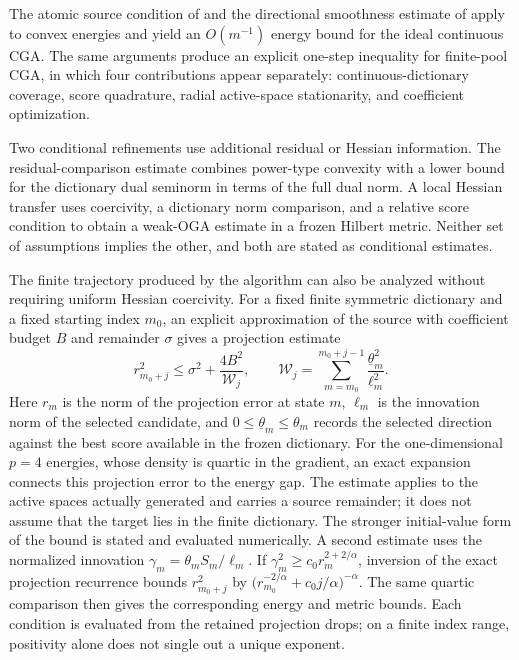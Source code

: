 The atomic source condition of  and the directional smoothness estimate of
 apply to convex energies and yield an \(O(m^{-1})\) energy bound for the ideal
continuous CGA. The same arguments produce an explicit one-step inequality for finite-pool CGA, in
which four contributions appear separately: continuous-dictionary coverage, score quadrature, radial
active-space stationarity, and coefficient optimization.

Two conditional refinements use additional residual or Hessian information. The residual-comparison
estimate combines power-type convexity with a lower bound for the dictionary dual seminorm in terms
of the full dual norm. A local Hessian transfer uses coercivity, a dictionary norm comparison, and a
relative score condition to obtain a weak-OGA estimate in a frozen Hilbert metric. Neither set of
assumptions implies the other, and both are stated as conditional estimates.

The finite trajectory produced by the algorithm can also be analyzed without requiring uniform
Hessian coercivity. For a fixed finite symmetric dictionary and a fixed starting index \(m_0\), an
explicit approximation of the source with coefficient budget \(B\) and remainder \(\sigma\) gives a
projection estimate
\[
 r_{m_0+j}^2\le \sigma^2+\frac{4B^2}{\mathcal W_j},
 \qquad
 \mathcal W_j=\sum_{m=m_0}^{m_0+j-1}\frac{\underline\theta_m^2}{\ell_m^2}.
\]
Here \(r_m\) is the norm of the projection error at state \(m\), \(\ell_m\) is the innovation norm of
the selected candidate, and \(0\leq\underline\theta_m\leq\theta_m\) records the selected direction
against the best score available in the frozen dictionary. For the one-dimensional \(p=4\) energies,
whose density is quartic in the gradient, an exact expansion connects this projection error to the
energy gap. The estimate applies to the active spaces actually generated and carries a source
remainder; it does not assume that the target lies in the finite dictionary. The stronger
initial-value form of the bound is stated and evaluated numerically. A second estimate uses the
normalized innovation \(\gamma_m=\theta_m S_m/\ell_m\). If
\(\gamma_m^2\geq c_0r_m^{2+2/\alpha}\), inversion of the exact projection recurrence bounds
\(r_{m_0+j}^2\) by
\(\big(r_{m_0}^{-2/\alpha}+c_0j/\alpha\big)^{-\alpha}\). The same quartic comparison
then gives the corresponding energy and metric bounds. Each condition is evaluated from the retained
projection drops; on a finite index range, positivity alone does not single out a unique exponent.

